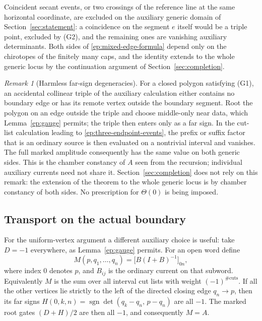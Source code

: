 \documentclass[11pt,letterpaper]{article}
\numberwithin{equation}{section}
\theoremstyle{definition}
\theoremstyle{remark}
\newtheorem{remark}[theorem]{Remark}
\DeclareMathOperator{\sgn}{sgn}
\begin{document}
Coincident secant events, or two crossings of the reference line at the
same horizontal coordinate, are excluded on the auxiliary generic domain
of Section~\ref{sec:statement}: a coincidence on the segment $e$ itself
would be a triple point, excluded by (G2), and the remaining ones are
vanishing auxiliary determinants.  Both sides of
\eqref{ep:mixed-edge-formula} depend only on the chirotopes of the
finitely many caps, and the identity extends to the whole generic locus
by the continuation argument of Section~\ref{sec:completion}.

\begin{remark}[Harmless far-sign degeneracies]
For a closed polygon satisfying (G1), an accidental collinear triple of
the auxiliary calculation either contains no boundary edge or has its
remote vertex outside the boundary segment. Root the polygon on an edge
outside the triple and choose middle-only near data, which
Lemma~\ref{ep:gauge} permits; the triple then enters only as a far sign.
In the cut-list calculation leading to \eqref{ep:three-endpoint-events},
the prefix or suffix factor that is an ordinary source is then evaluated
on a nontrivial interval and vanishes. The full marked amplitude
consequently has the same value on both generic sides. This is the
chamber constancy of $A$ seen from the recursion; individual auxiliary
currents need not share it. Section~\ref{sec:completion} does not rely on
this remark: the extension of the theorem to the whole generic locus is
by chamber constancy of both sides. No prescription for $\Theta(0)$ is
being imposed.
\end{remark}

\subsection{Transport on the actual boundary}
\label{ep:boundary-section}

For the uniform-vertex argument a different auxiliary choice is useful:
take $D=-1$ everywhere, as Lemma~\ref{ep:gauge} permits.  For an open
word define
\begin{equation}
 M(p,q_1,\ldots,q_n)
 =\bigl[B(I+B)^{-1}\bigr]_{0n},
 \label{ep:M}
\end{equation}
where index $0$ denotes $p$, and $B_{ij}$ is the ordinary current on that
subword.  Equivalently $M$ is the sum over all interval cut lists with
weight $(-1)^{\#\text{cuts}}$.  If all the other vertices lie strictly
to the left of the directed closing edge $q_n\to p$, then its far signs
$H(0,k,n)=\sgn\det(q_k-q_n,\,p-q_n)$ are all $-1$.
The marked root gates $(D+H)/2$ are then all $-1$, and consequently $M=A$.
\end{document}
